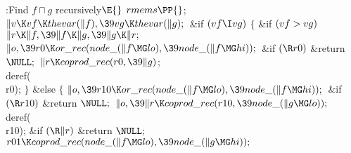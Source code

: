 \B{}:Find $f\sqcap g$ recursively\X${}\E{}$\6
$\\{rmems}\PP{}$;\6
${}\|v\K\\{vf}\K\\{thevar}(\|f),\39\\{vg}\K\\{thevar}(\|g);{}$\6
\&{if} ${}(\\{vf}\I\\{vg}){}$\5
${}\{{}$\1\6
\&{if} ${}(\\{vf}>\\{vg}){}$\1\5
${}\|r\K\|f,\39\|f\K\|g,\39\|g\K\|r;{}$\2\6
${}\|o,\39\\{r0}\K\\{or\_rec}(\\{node\_}(\|f\MG\\{lo}),\39\\{node\_}(\|f\MG%
\\{hi}));{}$\6
\&{if} ${}(\R\\{r0}){}$\1\5
\&{return} ${}\NULL;{}$\2\6
${}\|r\K\\{coprod\_rec}(\\{r0},\39\|g){}$;\6
\\{deref}(\\{r0});\6
\4${}\}{}$\5
\2\&{else}\5
${}\{{}$\1\6
${}\|o,\39\\{r10}\K\\{or\_rec}(\\{node\_}(\|f\MG\\{lo}),\39\\{node\_}(\|f\MG%
\\{hi}));{}$\6
\&{if} ${}(\R\\{r10}){}$\1\5
\&{return} ${}\NULL;{}$\2\6
${}\|o,\39\|r\K\\{coprod\_rec}(\\{r10},\39\\{node\_}(\|g\MG\\{lo}));{}$\6
\\{deref}(\\{r10});\6
\&{if} ${}(\R\|r){}$\1\5
\&{return} ${}\NULL;{}$\2\6
${}\\{r01}\K\\{coprod\_rec}(\\{node\_}(\|f\MG\\{lo}),\39\\{node\_}(\|g\MG%
\\{hi}));{}$\6
